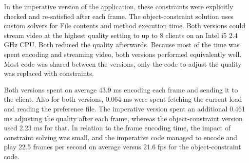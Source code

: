 In the imperative version of the application, these constraints were
explicitly checked and re-satisfied after each frame. The
object-constraint solution uses custom solvers for File contents and
method execution time.  Both versions could stream video at the
highest quality setting to up to 8 clients on an Intel i5 2.4 GHz
CPU. Both reduced the quality afterwards. Because most of the time was
spent encoding and streaming video, both versions performed
equivalently well. Most code was shared between the versions, only the
code to adjust the quality was replaced with constraints.

Both versions spent on average 43.9 ms encoding each frame and sending
it to the client. Also for both versions, 0.064 ms were spent fetching
the current load and reading the preference file. The imperative
version spent an additional 0.461 ms adjusting the quality after each
frame, whereas the object-constraint version used 2.23 ms for that. In
relation to the frame encoding time, the impact of constraint solving
was small, and the imperative code managed to encode and play 22.5
frames per second on average versus 21.6 fps for the object-constraint
code.




